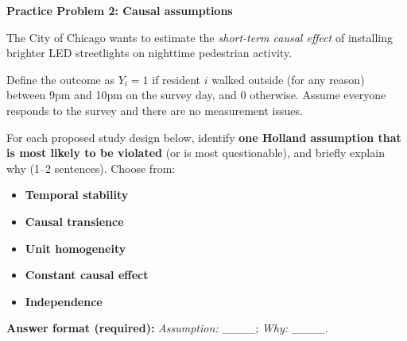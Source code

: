 \documentclass[12pt]{article}
\begin{document}
\vspace{0.5em}
\noindent\textbf{Practice Problem 2: Causal assumptions} \cite{holland1986statistics}

\noindent The City of Chicago wants to estimate the \emph{short-term causal effect} of installing
brighter LED streetlights on nighttime pedestrian activity.

\noindent Define the outcome as $Y_i = 1$ if resident $i$ walked outside (for any reason) between
9pm and 10pm on the survey day, and $0$ otherwise. Assume everyone responds to the survey
and there are no measurement issues.

\vspace{0.5em}
\noindent For each proposed study design below, identify \textbf{one Holland assumption that is most
likely to be violated} (or is most questionable), and briefly explain why (1--2 sentences).
Choose from:

\begin{itemize}
  \item \textbf{Temporal stability}
  \item \textbf{Causal transience} 
  \item \textbf{Unit homogeneity}
  \item \textbf{Constant causal effect}
  \item \textbf{Independence}
\end{itemize}

\noindent \textbf{Answer format (required):} \emph{Assumption:} \_\_\_\_; \emph{Why:} \_\_\_\_.
\end{document}
